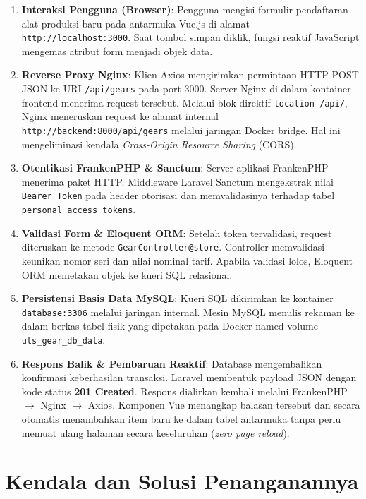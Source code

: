 \documentclass[a4paper,oneside,11pt]{book}
\begin{document}
\begin{enumerate}
\item \textbf{Interaksi Pengguna (Browser)}: Pengguna mengisi formulir pendaftaran alat produksi baru pada antarmuka Vue.js di alamat \texttt{http://localhost:3000}. Saat tombol simpan diklik, fungsi reaktif JavaScript mengemas atribut form menjadi objek data.
\item \textbf{Reverse Proxy Nginx}: Klien Axios mengirimkan permintaan HTTP POST JSON ke URI \texttt{/api/gears} pada port 3000. Server Nginx di dalam kontainer frontend menerima request tersebut. Melalui blok direktif \texttt{location /api/}, Nginx meneruskan request ke alamat internal \texttt{http://backend:8000/api/gears} melalui jaringan Docker bridge. Hal ini mengeliminasi kendala \textit{Cross-Origin Resource Sharing} (CORS).
\item \textbf{Otentikasi FrankenPHP \& Sanctum}: Server aplikasi FrankenPHP menerima paket HTTP. Middleware Laravel Sanctum mengekstrak nilai \texttt{Bearer Token} pada header otorisasi dan memvalidasinya terhadap tabel \texttt{personal\_access\_tokens}.
\item \textbf{Validasi Form \& Eloquent ORM}: Setelah token tervalidasi, request diteruskan ke metode \texttt{GearController@store}. Controller memvalidasi keunikan nomor seri dan nilai nominal tarif. Apabila validasi lolos, Eloquent ORM memetakan objek ke kueri SQL relasional.
\item \textbf{Persistensi Basis Data MySQL}: Kueri SQL dikirimkan ke kontainer \texttt{database:3306} melalui jaringan internal. Mesin MySQL menulis rekaman ke dalam berkas tabel fisik yang dipetakan pada Docker named volume \texttt{uts\_gear\_db\_data}.
\item \textbf{Respons Balik \& Pembaruan Reaktif}: Database mengembalikan konfirmasi keberhasilan transaksi. Laravel membentuk payload JSON dengan kode status \textbf{201 Created}. Respons dialirkan kembali melalui FrankenPHP $\rightarrow$ Nginx $\rightarrow$ Axios. Komponen Vue menangkap balasan tersebut dan secara otomatis menambahkan item baru ke dalam tabel antarmuka tanpa perlu memuat ulang halaman secara keseluruhan (\textit{zero page reload}).
\end{enumerate}

\chapter{Kendala dan Solusi Penanganannya}
\end{document}
